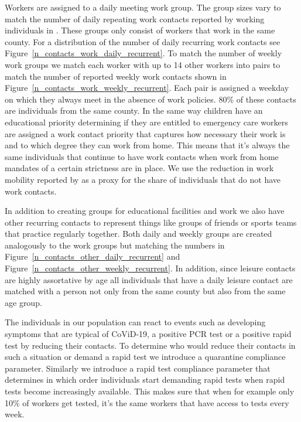 Workers are assigned to a daily meeting work group. The group sizes vary to match the
number of daily repeating work contacts reported by working individuals in
\cite{Mossong2008}. These groups only consist of workers that work in the same county.
For a distribution of the number of daily recurring work contacts see
Figure~\ref{n_contacts_work_daily_recurrent}. To match the number of weekly work groups
we match each worker with up to 14 other workers into pairs to match the number of
reported weekly work contacts shown in Figure~\ref{n_contacts_work_weekly_recurrent}.
Each pair is assigned a weekday on which they always meet in the absence of work
policies. 80\% of these contacts are individuals from the same county.%
In the same way children have an educational priority determining if they are entitled to
emergency care workers are assigned a work contact priority that captures how necessary
their work is and to which degree they can work from home. This means that it's always
the same individuals that continue to have work contacts when work from home mandates of
a certain strictness are in place. We use the reduction in work mobility reported by
\cite{Google2021} as a proxy for the share of individuals that do not have work contacts.

In addition to creating groups for educational facilities and work we also have other
recurring contacts to represent things like groups of friends or sports teams that
practice regularly together. Both daily and weekly groups are created analogously to the
work groups but matching the numbers in Figure~\ref{n_contacts_other_daily_recurrent} and
Figure~\ref{n_contacts_other_weekly_recurrent}. In addition, since leisure contacts are
highly assortative by age all individuals that have a daily leisure contact are matched
with a person not only from the same county but also from the same age group.

The individuals in our population can react to events such as developing symptoms that
are typical of CoViD-19, a positive PCR test or a positive rapid test by reducing their
contacts. To determine who would reduce their contacts in such a situation or demand a
rapid test we introduce a quarantine compliance parameter. Similarly we introduce a rapid
test compliance parameter that determines in which order individuals start demanding
rapid tests when rapid tests become increasingly available. This makes sure that when for
example only 10\% of workers get tested, it's the same workers that have access to tests
every week.

